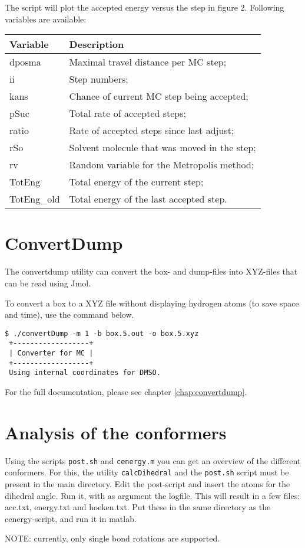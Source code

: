 The script will plot the accepted energy versus the step in figure 2. Following 
variables are available:

\begin{tabular}{ll}
	Variable & Description \\ \hline
	dposma & Maximal travel distance per MC step; \\
	ii & Step numbers; \\
	kans & Chance of current MC step being accepted; \\
	pSuc & Total rate of accepted steps; \\
	ratio & Rate of accepted steps since last adjust; \\
	rSo & Solvent molecule that was moved in the step; \\
	rv & Random variable for the Metropolis method; \\
	TotEng & Total energy of the current step; \\
	TotEng\_old & Total energy of the last accepted step. \\
\end{tabular}

\section{ConvertDump}
The convertdump utility can convert the box- and dump-files into XYZ-files that 
can be read using Jmol.

To convert a box to a XYZ file without displaying hydrogen atoms (to save space 
and time), use the command below.

\begin{lstlisting}[caption=Convert a box to a XYZ file]
$ ./convertDump -m 1 -b box.5.out -o box.5.xyz
 +------------------+
 | Converter for MC |
 +------------------+
 Using internal coordinates for DMSO.
\end{lstlisting}

For the full documentation, please see chapter \ref{chap:convertdump}.

\section{Analysis of the conformers}
Using the scripts \verb|post.sh| and \verb|cenergy.m| you can get an overview 
of the different conformers. For this, the utility \verb|calcDihedral| and the 
\verb|post.sh| script must be present in the main directory. Edit the 
post-script and insert the atoms for the dihedral angle. Run it, with as 
argument the logfile. This will result in a few files: acc.txt, energy.txt and 
hoeken.txt. Put these in the same directory as the cenergy-script, and run it 
in matlab.

NOTE: currently, only single bond rotations are supported.